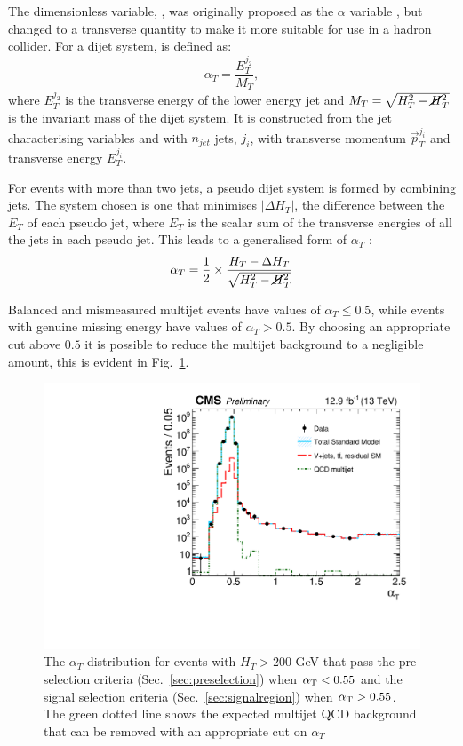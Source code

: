 The dimensionless variable, \alphat, was originally proposed as the
$\alpha$ variable \cite{Randall:2008rw}, but changed to a transverse
quantity to make it more suitable for use in a hadron collider.  For a
dijet system, \alphat is defined as: 
\begin{equation}
\alpha_T=\frac{E_T^{j_2}}{M_T}, \end{equation} 
where $E_T^{j_2}$ is the transverse energy of the lower energy jet and
$M_T=\sqrt{H_T^2-\cancel{H}_T^2}$ is the invariant mass of the dijet
system. It is constructed from the jet characterising variables \HT
and \MHT with $n_{jet}$ jets, $j_i$, with transverse momentum
$\vec{p}_T^{j_i}$ and transverse energy $E_T^{j_i}$. 

For events with more than two jets, a pseudo dijet system is formed by
combining jets.  The system chosen is one that minimises $|\Delta
H_T|$, the difference between the $E_T$ of each pseudo jet,
where $E_T$ is the scalar sum of the transverse energies of all the
jets in each pseudo jet. This leads to a generalised form of
$\alpha_T$
\cite{AlphaT8TeVChatrchyan:2013lya}: 
\begin{equation}
\alpha_T=\frac{1}{2}\times\frac{H_T-\Delta
H_T}{\sqrt{H_T^2-\cancel{H}_T^2}} \end{equation} 
  
Balanced and
mismeasured multijet events have values of $\alpha_T\leq0.5$, while
events with genuine missing energy have values of $\alpha_T>0.5$. By
choosing an appropriate cut above $0.5$ it is possible to reduce the
multijet background to a negligible amount, this is evident in
Fig.~\ref{fig:alphaT}. 

\begin{figure}
	\begin{center}
		\includegraphics[width=0.8\linewidth]{figs/analysis/eventSelection/CMS-PAS-SUS-16-016_Figure-aux_001}%
	\end{center}
  \caption{The $\alpha_T$ distribution for events with $H_T>200$ GeV
  that pass the pre-selection criteria (Sec.~\ref{sec:preselection}) when
  $\alpha_{\text{T}}<0.55$ and the signal selection criteria
  (Sec.~\ref{sec:signalregion}) when
  $\alpha_{\text{T}}>0.55$. The green dotted line shows the expected multijet
  QCD background that can be removed with an appropriate cut on
  $\alpha_T$}
	\label{fig:alphaT}
\end{figure}

